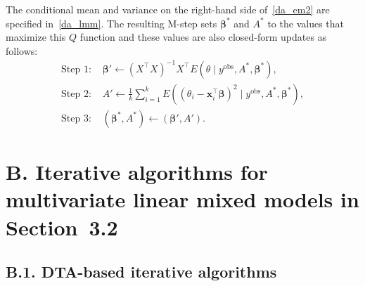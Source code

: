 \documentclass[12pt]{article}
\begin{document}
\begin{appendix}
\begin{equation}
\end{equation}
The conditional mean and variance on the right-hand side of~\eqref{da_em2} are specified in~\eqref{da_lmm}. The resulting M-step sets  $\boldsymbol{\beta}^\ast$ and $A^\ast$ to the values that maximize this $Q$ function and these values are also closed-form updates as follows:
\begin{align}
\textrm{Step 1: }& \boldsymbol{\beta}'\gets(X^\top X)^{-1}X^\top E(\theta\mid y^{\textrm{obs}}, A^\ast, \boldsymbol{\beta}^\ast)\nonumber,\\
\textrm{Step 2: }&A'\gets \frac{1}{k}\sum_{i=1}^kE\left( (
\theta_i-\boldsymbol{x}^\top_i\boldsymbol{\beta})^2\mid y^{\textrm{obs}}, A^\ast, \boldsymbol{\beta}^\ast\right)\nonumber,\\
\textrm{Step 3: }&(\boldsymbol{\beta}^\ast, A^\ast)\gets (\boldsymbol{\beta}', A')\nonumber.
\end{align}



\section{B. Iterative algorithms for multivariate linear mixed models in Section~3.2}\label{app22}
\subsection{B.1. DTA-based iterative algorithms}\label{app221}


\end{appendix}
\end{document}
